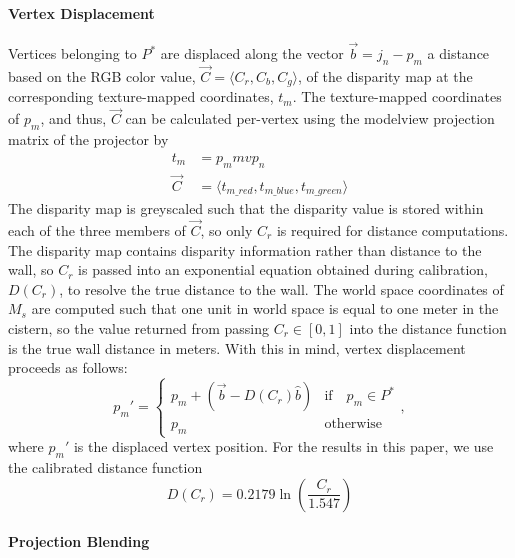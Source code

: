\documentclass{llncs}
\begin{document}
\paragraph{Vertex Displacement}
Vertices belonging to $P^{*}$ are displaced along the vector $\vec{b} = j_{n} - p_{m}$ a distance based on the RGB color value, $\vec{C} = \langle C_{r}, C_{b}, C_{g} \rangle$, of the disparity map at the corresponding texture-mapped coordinates, $t_m$. The texture-mapped coordinates of $p_m$, and thus, $\vec{C}$ can be calculated per-vertex using the modelview projection matrix of the projector by
\begin{align}
t_{m} &= p_{m} mvp_{n} \\
\vec{C} &= \langle t_{m\_red}, t_{m\_blue}, t_{m\_green} \rangle
\end{align}
The disparity map is greyscaled such that the disparity value is stored within each of the three members of $\vec{C}$, so only $C_r$ is required for distance computations. The disparity map contains disparity information rather than distance to the wall, so $C_r$ is passed into an exponential equation obtained during calibration, $D(C_r)$, to resolve the true distance to the wall. The world space coordinates of $M_s$ are computed such that one unit in world space is equal to one meter in the cistern, so the value returned from passing $C_r \in [0, 1]$ into the distance function is the true wall distance in meters. With this in mind, vertex displacement proceeds as follows:
\begin{equation}
p_{m}' = \left \{ 
\begin{array}{ll}
p_{m} + (\vec{b} - D(C_r)\hat{b})  & \text{if} \quad p_{m} \in P^{*}\\
p_{m} & \text{otherwise}
\end{array},\right.
\label{eq:displace}
\end{equation}
where $p_{m}'$ is the displaced vertex position. For the results in this paper, we use the calibrated distance function
\begin{equation}
D(C_r) = 0.2179\ln{\left(\frac{C_r}{1.547}\right)}
\label{eq:calibration}
\end{equation}
 \paragraph{Projection Blending}
\end{document}
